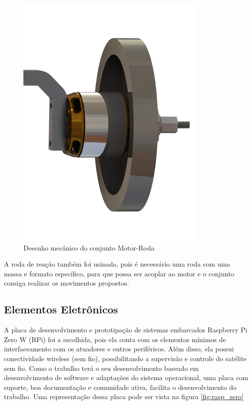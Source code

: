 \begin{figure}[H]
  \caption{Desenho mecânico do conjunto Motor-Roda}
  \begin{center}
      \includegraphics[scale=.45]{metodologia/img/motor_roda_desenho}
  \end{center}
  \label{fig:motor_roda_desenho}
\end{figure}

A roda de reação também foi usinada, pois é necessário uma roda com uma massa e formato específico, para que possa ser acoplar ao motor e o conjunto consiga realizar os movimentos propostos. 



\subsection{Elementos Eletrônicos}

A placa de desenvolvimento e prototipação de sistemas embarcados Raspberry Pi Zero W (RPi) foi a escolhida, pois ela conta com os elementos mínimos de interfaceamento com os atuadores e outros periféricos. Além disso, ela possui conectividade wireless (sem fio), possibilitando a supervisão e controle do satélite sem fio. Como o trabalho terá o seu desenvolvimento baseado em desenvolvimento de software e adaptações do sistema operacional, uma placa com suporte, boa documentação e comunidade ativa, facilita o desenvolvimento do trabalho. Uma representação dessa placa pode ser vista na figura \ref{fig:rasp_zero}

